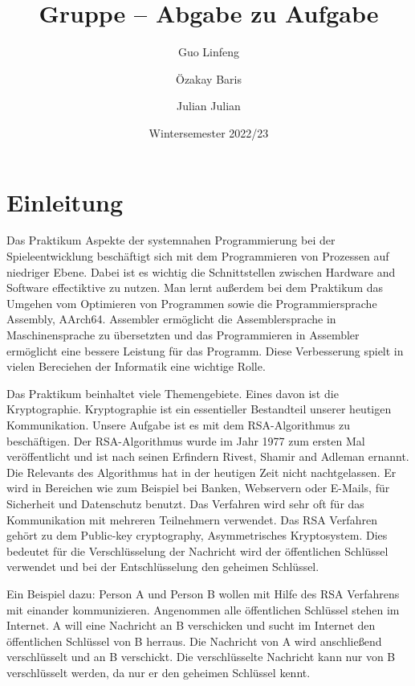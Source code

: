 \documentclass[course=asp]{aspdoc}
\author{Guo Linfeng \and Özakay Baris \and Julian Julian}
\date{Wintersemester 2022/23} %
\title{Gruppe \theGroup{} -- Abgabe zu Aufgabe \theNumber}
\begin{document}
\maketitle

\section{Einleitung}
Das Praktikum Aspekte der systemnahen Programmierung bei der Spieleentwicklung beschäftigt sich mit dem Programmieren von Prozessen auf niedriger Ebene. Dabei ist es wichtig die Schnittstellen zwischen Hardware and Software effectiktive zu nutzen. Man lernt außerdem bei dem Praktikum das Umgehen vom Optimieren von Programmen sowie die Programmiersprache Assembly, AArch64. Assembler ermöglicht die Assemblersprache in Maschinensprache zu übersetzten und das Programmieren in Assembler ermöglicht eine bessere Leistung für das Programm. Diese Verbesserung spielt in vielen Bereciehen der Informatik eine wichtige Rolle.

Das Praktikum beinhaltet viele Themengebiete. Eines davon ist die Kryptographie. Kryptographie ist ein essentieller Bestandteil unserer heutigen Kommunikation. Unsere Aufgabe ist es mit dem RSA-Algorithmus zu beschäftigen. Der RSA-Algorithmus wurde im Jahr 1977 zum ersten Mal veröffentlicht und ist nach seinen Erfindern Rivest, Shamir and Adleman ernannt. Die Relevants des Algorithmus hat in der heutigen Zeit nicht nachtgelassen. Er wird in Bereichen wie zum Beispiel bei Banken, Webservern oder E-Mails, für Sicherheit und Datenschutz benutzt. Das Verfahren wird sehr oft für das Kommunikation mit mehreren Teilnehmern verwendet. Das RSA Verfahren gehört zu dem Public-key cryptography, Asymmetrisches Kryptosystem. Dies bedeutet für die Verschlüsselung der Nachricht wird der öffentlichen Schlüssel verwendet und bei der Entschlüsselung den geheimen Schlüssel. 

Ein Beispiel dazu: Person A und Person B wollen mit Hilfe des RSA Verfahrens mit einander kommunizieren. Angenommen alle öffentlichen Schlüssel stehen im Internet. A will eine Nachricht an B verschicken und sucht im Internet den öffentlichen Schlüssel von B herraus. Die Nachricht von A wird anschließend verschlüsselt und an B verschickt. Die verschlüsselte Nachricht kann nur von B verschlüsselt werden, da nur er den geheimen Schlüssel kennt. 
 
\end{document}
